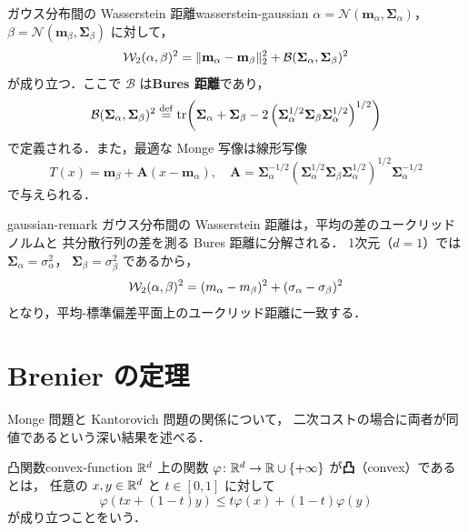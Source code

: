 \begin{theorem}{ガウス分布間の Wasserstein 距離}{wasserstein-gaussian}
  $\alpha = \mathcal{N}(\mathbf{m}_\alpha, \mathbf{\Sigma}_\alpha)$，
  $\beta = \mathcal{N}(\mathbf{m}_\beta, \mathbf{\Sigma}_\beta)$ に対して，
  \[
    \mathcal{W}_2(\alpha, \beta)^2
    = \lVert \mathbf{m}_\alpha - \mathbf{m}_\beta \rVert_2^2
    + \mathcal{B}(\mathbf{\Sigma}_\alpha, \mathbf{\Sigma}_\beta)^2
  \]
  が成り立つ．ここで $\mathcal{B}$ は\textbf{Bures 距離}であり，
  \[
    \mathcal{B}(\mathbf{\Sigma}_\alpha, \mathbf{\Sigma}_\beta)^2
    \overset{\mathrm{def}}{=} \operatorname{tr}\!\left(
    \mathbf{\Sigma}_\alpha + \mathbf{\Sigma}_\beta
    - 2 \left( \mathbf{\Sigma}_\alpha^{1/2} \mathbf{\Sigma}_\beta \mathbf{\Sigma}_\alpha^{1/2} \right)^{1/2}
    \right)
  \]
  で定義される．また，最適な Monge 写像は線形写像
  \[
    T(x) = \mathbf{m}_\beta + \mathbf{A}(x - \mathbf{m}_\alpha), \quad
    \mathbf{A} = \mathbf{\Sigma}_\alpha^{-1/2}
    \left( \mathbf{\Sigma}_\alpha^{1/2} \mathbf{\Sigma}_\beta \mathbf{\Sigma}_\alpha^{1/2} \right)^{1/2}
    \mathbf{\Sigma}_\alpha^{-1/2}
  \]
  で与えられる．
\end{theorem}

\begin{remark}{}{gaussian-remark}
  ガウス分布間の Wasserstein 距離は，平均の差のユークリッドノルムと
  共分散行列の差を測る Bures 距離に分解される．
  1次元（$d = 1$）では $\mathbf{\Sigma}_\alpha = \sigma_\alpha^2$，
  $\mathbf{\Sigma}_\beta = \sigma_\beta^2$ であるから，
  \[
    \mathcal{W}_2(\alpha, \beta)^2 = (m_\alpha - m_\beta)^2 + (\sigma_\alpha - \sigma_\beta)^2
  \]
  となり，平均-標準偏差平面上のユークリッド距離に一致する．
\end{remark}

\section{Brenier の定理}
\label{sec:brenier}

Monge 問題と Kantorovich 問題の関係について，
二次コストの場合に両者が同値であるという深い結果を述べる．

\begin{definition}{凸関数}{convex-function}
  $\mathbb{R}^d$ 上の関数 $\varphi \colon \mathbb{R}^d \to \mathbb{R} \cup \{+\infty\}$ が\textbf{凸}（convex）であるとは，
  任意の $x, y \in \mathbb{R}^d$ と $t \in [0, 1]$ に対して
  \[
    \varphi(tx + (1-t)y) \leq t\varphi(x) + (1-t)\varphi(y)
  \]
  が成り立つことをいう．
\end{definition}

